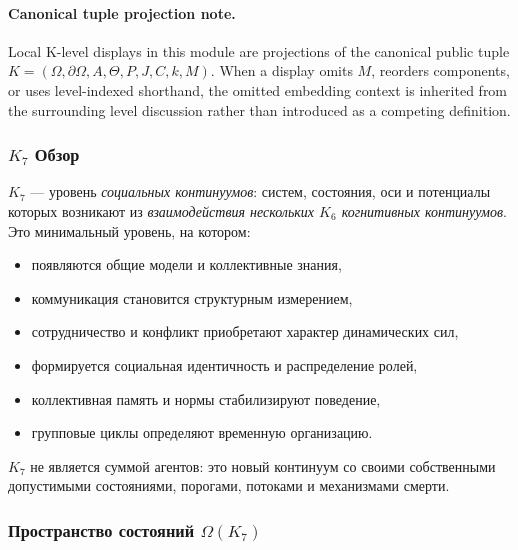 



\paragraph{Canonical tuple projection note.}
Local K-level displays in this module are projections of the canonical public tuple \(K=(\Omega,\partial\Omega,A,\Theta,P,J,C,k,M)\). When a display omits \(M\), reorders components, or uses level-indexed shorthand, the omitted embedding context is inherited from the surrounding level discussion rather than introduced as a competing definition.

\subsubsection{\texorpdfstring{$K_7$}{K_7} Обзор}
\label{sec:k7-overview}

$K_7$ — уровень \emph{социальных континуумов}: систем, состояния,
оси и потенциалы которых возникают из \emph{взаимодействия нескольких $K_6$
когнитивных континуумов}. Это минимальный уровень, на котором:

\begin{itemize}
    \item появляются общие модели и коллективные знания,
    \item коммуникация становится структурным измерением,
    \item сотрудничество и конфликт приобретают характер динамических сил,
    \item формируется социальная идентичность и распределение ролей,
    \item коллективная память и нормы стабилизируют поведение,
    \item групповые циклы определяют временную организацию.
\end{itemize}

$K_7$ не является суммой агентов: это новый континуум со своими
собственными допустимыми состояниями, порогами, потоками и механизмами
смерти.

\subsubsection{Пространство состояний \texorpdfstring{$\Omega(K_7)$}{\Omega(K_7)}}

